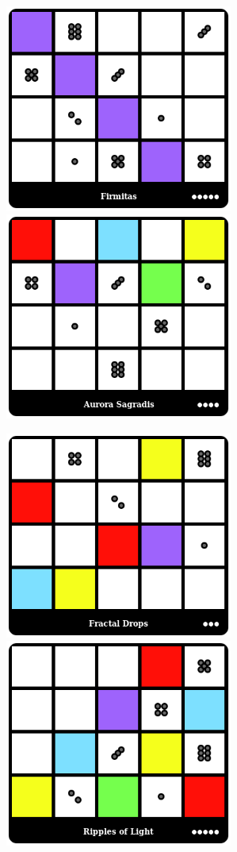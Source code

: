 \centerline{\mbox{\includegraphics[width=75mm]{img/WPC/Firmitas.png}\includegraphics[width=75mm]{img/WPC/AuroraSagradis.png}}}
\centerline{\mbox{\includegraphics[width=75mm]{img/WPC/FractalDrops.png}\includegraphics[width=75mm]{img/WPC/RipplesofLight.png}}}

